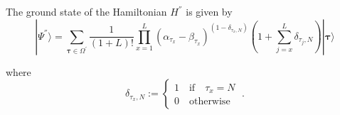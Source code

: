 \documentclass[10pt]{article}
\numberwithin{equation}{section}
\numberwithin{equation}{subsection}
\newcommand{\dt}{\;.}
\begin{document}
The ground state of the Hamiltonian $H^{''}$ is given by 
\begin{equation}\label{ResulsBasis}
	|\Psi^{''} \rangle= \sum_{\bm{\tau}\in \Omega^{'}}\frac{1}{\left(1+L\right)!}\prod_{x=1}^{L} (\alpha_{\tau_{x}}-\beta_{\tau_{x}})^{(1-\delta_{\tau_{x},N})}\left(1+\sum_{j=x}^{L}\delta_{\tau_{j},N}\right) |\bm{\tau}\rangle
\end{equation}

where 
\begin{equation}
    \delta_{\tau_{x},N}:=\begin{cases}
        1\quad \text{if}\quad \tau_{x}=N\\
        0\quad \text{otherwise}
    \end{cases}\dt
\end{equation} 
\end{document}
